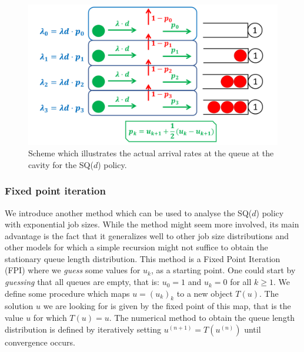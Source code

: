 \documentclass[12pt]{report}
\begin{document}
\begin{figure}
	\begin{center}
		\includegraphics[scale=0.4]{figures/Chapter1/SQd_act_arr_rate.PNG}
	\end{center}
	\caption{Scheme which illustrates the actual arrival rates at the queue at the cavity for the SQ($d$) policy.} \label{fig:SQd_act_arr_rate}
\end{figure}
\subsubsection{Fixed point iteration}
We introduce another method which can be used to analyse the SQ($d$) policy with exponential job sizes. While the method might seem more involved, its main advantage is the fact that it generalizes well to other job size distributions and other models for which a simple recursion might not suffice to obtain the stationary queue length distribution. This method is a Fixed Point Iteration (FPI) where we \textit{guess} some values for $u_k$, as a starting point. One could start by \textit{guessing} that all queues are empty, that is: $u_0 = 1$ and $u_k = 0$ for all $k\geq 1$. We define some procedure which maps $u = (u_k)_k$ to a new object $T(u)$. The solution $u$ we are looking for is given by the fixed point of this map, that is the value $u$ for which $T(u) = u$. The numerical method to obtain the queue length distribution is defined by iteratively setting $u^{(n+1)} = T(u^{(n)})$ until convergence occurs.
\end{document}
